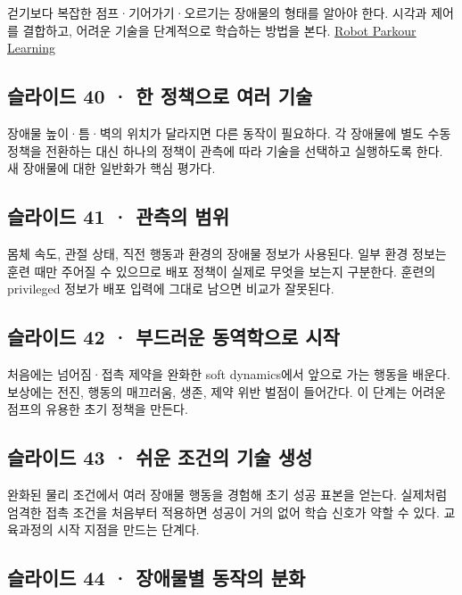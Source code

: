 \documentclass[11pt,a4paper]{article}
\begin{document}
걷기보다 복잡한 점프·기어가기·오르기는 장애물의 형태를 알아야 한다. 시각과 제어를 결합하고, 어려운 기술을 단계적으로 학습하는 방법을 본다. \href{https://arxiv.org/abs/2309.05665}{Robot Parkour Learning}\par

\subsection{슬라이드 40 · 한 정책으로 여러 기술}

장애물 높이·틈·벽의 위치가 달라지면 다른 동작이 필요하다. 각 장애물에 별도 수동 정책을 전환하는 대신 하나의 정책이 관측에 따라 기술을 선택하고 실행하도록 한다. 새 장애물에 대한 일반화가 핵심 평가다.\par

\subsection{슬라이드 41 · 관측의 범위}

몸체 속도, 관절 상태, 직전 행동과 환경의 장애물 정보가 사용된다. 일부 환경 정보는 훈련 때만 주어질 수 있으므로 배포 정책이 실제로 무엇을 보는지 구분한다. 훈련의 privileged 정보가 배포 입력에 그대로 남으면 비교가 잘못된다.\par

\subsection{슬라이드 42 · 부드러운 동역학으로 시작}

처음에는 넘어짐·접촉 제약을 완화한 soft dynamics에서 앞으로 가는 행동을 배운다. 보상에는 전진, 행동의 매끄러움, 생존, 제약 위반 벌점이 들어간다. 이 단계는 어려운 점프의 유용한 초기 정책을 만든다.\par

\subsection{슬라이드 43 · 쉬운 조건의 기술 생성}

완화된 물리 조건에서 여러 장애물 행동을 경험해 초기 성공 표본을 얻는다. 실제처럼 엄격한 접촉 조건을 처음부터 적용하면 성공이 거의 없어 학습 신호가 약할 수 있다. 교육과정의 시작 지점을 만드는 단계다.\par

\subsection{슬라이드 44 · 장애물별 동작의 분화}
\end{document}
